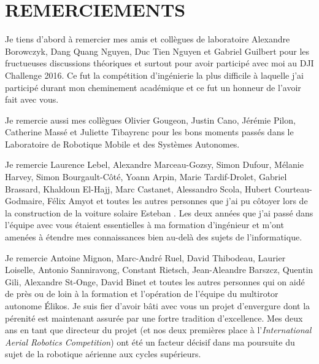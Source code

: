 %
\chapter*{REMERCIEMENTS}\thispagestyle{headings}
%

Je tiens d'abord à remercier mes amis et collègues de laboratoire Alexandre Borowczyk, Dang Quang Nguyen, Duc Tien Nguyen et Gabriel Guilbert pour les fructueuses discussions théoriques et surtout pour avoir participé avec moi au DJI Challenge 2016. Ce fut la compétition d'ingénierie la plus difficile à laquelle j'ai participé durant mon cheminement académique et ce fut un honneur de l'avoir fait avec vous.

Je remercie aussi mes collègues Olivier Gougeon, Justin Cano, Jérémie Pilon, Catherine Massé et Juliette Tibayrenc pour les bons moments passés dans le Laboratoire de Robotique Mobile et des Systèmes Autonomes.

\newcommand{\RNum}[1]{\uppercase\expandafter{\romannumeral #1\relax}}

Je remercie Laurence Lebel, Alexandre Marceau-Gozsy, Simon Dufour, Mélanie Harvey, Simon Bourgault-Côté, Yoann Arpin, Marie Tardif-Drolet, Gabriel Brassard, Khaldoun El-Hajj, Marc Castanet, Alessandro Scola, Hubert Courteau-Godmaire, Félix Amyot et toutes les autres personnes que j'ai pu côtoyer lors de la construction de la voiture solaire Esteban \RNum{6}. Les deux années que j'ai passé dans l'équipe avec vous étaient essentielles à ma formation d'ingénieur et m'ont amenées à étendre mes connaissances bien au-delà des sujets de l'informatique.

Je remercie Antoine Mignon, Marc-André Ruel, David Thibodeau, Laurier Loiselle, Antonio Sanniravong, Constant Rietsch, Jean-Aleandre Barszcz, Quentin Gili, Alexandre St-Onge, David Binet et toutes les autres personnes qui on aidé de près ou de loin à la formation et l'opération de l'équipe du multirotor autonome Élikos. Je suis fier d'avoir bâti avec vous un projet d'envergure dont la pérenité est maintenant assurée par une fortre tradition d'excellence. Mes deux ans en tant que directeur du projet (et nos deux premières place à l'\emph{International Aerial Robotics Competition}) ont été un facteur décisif dans ma poursuite du sujet de la robotique aérienne aux cycles supérieurs.

